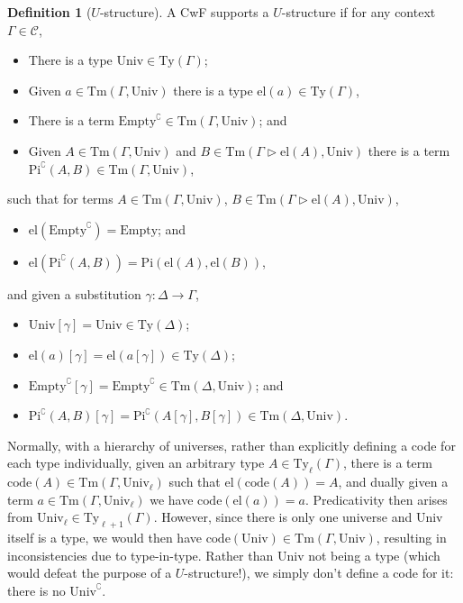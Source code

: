 \documentclass{article}
\renewcommand{\_}{\textrm{\textscale{.5}{\textunderscore}}}
\newcommand{\Tm}{\mathrm{Tm}}
\newcommand{\Ty}{\mathrm{Ty}}
\newcommand{\Empty}{\mathrm{Empty}}
\newcommand{\pitype}{\mathrm{Pi}}
\newcommand{\univ}{\mathrm{Univ}}
\newcommand{\El}{\mathrm{el}}
\newcommand{\code}[1]{#1^{\complement}}
\theoremstyle{definition}
\newtheorem{definition}{Definition}[section]
\theoremstyle{plain}
\begin{document}
\begin{definition}[$U$-structure]
A CwF supports a $U$-structure if for any context $\Gamma \in \mathcal{C}$,
\begin{itemize}
    \item There is a type $\univ \in \Ty(\Gamma)$;
    \item Given $a \in \Tm(\Gamma, \univ)$ there is a type $\El(a) \in \Ty(\Gamma)$,
    \item There is a term $\code{\Empty} \in \Tm(\Gamma, \univ)$; and
    \item Given $A \in \Tm(\Gamma, \univ)$ and $B \in \Tm(\Gamma \rhd \El(A), \univ)$ there is a term $\code{\pitype}(A, B) \in \Tm(\Gamma, \univ)$,
\end{itemize}
such that for terms $A \in \Tm(\Gamma, \univ)$, $B \in \Tm(\Gamma \rhd \El(A), \univ)$,
\begin{itemize}
    \item $\El(\code{\Empty}) = \Empty$; and
    \item $\El(\code{\pitype}(A, B)) = \pitype(\El(A), \El(B))$,
\end{itemize}
and given a substitution $\gamma : \Delta \to \Gamma$,
\begin{itemize}
    \item $\univ[\gamma] = \univ \in \Ty(\Delta)$;
    \item $\El(a)[\gamma] = \El(a[\gamma]) \in \Ty(\Delta)$;
    \item $\code{\Empty}[\gamma] = \code{\Empty} \in \Tm(\Delta, \univ)$; and
    \item $\code{\pitype}(A, B)[\gamma] = \code{\pitype}(A[\gamma], B[\gamma]) \in \Tm(\Delta, \univ)$.
\end{itemize}
\end{definition}

Normally, with a hierarchy of universes,
rather than explicitly defining a code for each type individually,
given an arbitrary type $A \in \Ty_{\ell}(\Gamma)$,
there is a term $\mathrm{code}(A) \in \Tm(\Gamma, \univ_{\ell})$
such that $\El(\mathrm{code}(A)) = A$,
and dually given a term $a \in \Tm(\Gamma, \univ_{\ell})$
we have $\mathrm{code}(\El(a)) = a$.
Predicativity then arises from $\univ_{\ell} \in \Ty_{\ell + 1}(\Gamma)$.
However, since there is only one universe and $\univ$ itself is a type,
we would then have $\mathrm{code}(\univ) \in \Tm(\Gamma, \univ)$,
resulting in inconsistencies due to type-in-type.
Rather than $\univ$ not being a type (which would defeat the purpose of a $U$-structure!),
we simply don't define a code for it: there is no $\code{\univ}$.
\end{document}

